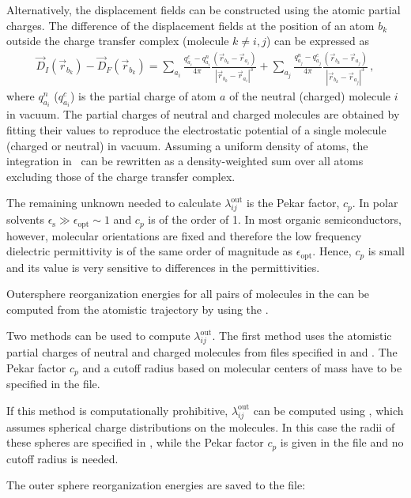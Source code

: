 Alternatively, the displacement fields can be constructed using the atomic partial charges. The difference of the displacement fields at the position of an atom $b_k$ outside the charge transfer complex (molecule $k \ne i,j$)  can be expressed as
\begin{eqnarray}
\label{equ:disp_atom}
\vec{D}_I(\vec{r}_{b_k}) - \vec{D}_F(\vec{r}_{b_k})  = 
\sum_{a_i} \frac{q_{a_i}^c - q_{a_i}^n}{4\pi } \frac{ (\vec{r}_{b_k} - \vec{r}_{a_i} ) }
                                            {|\vec{r}_{b_k}-\vec{r}_{a_i}|^3}+
\sum_{a_j} \frac{q_{a_j}^n - q_{a_j}^c}{4\pi } \frac{ (\vec{r}_{b_k}-\vec{r}_{a_j} ) } 
                                            {|\vec{r}_{b_k}-\vec{r}_{a_j}|^3}\,,
\end{eqnarray}
where $q^n_{a_i}$ ($q^c_{a_i}$) is the partial charge of atom $a$ of the neutral (charged) molecule $i$ in vacuum. The partial charges of neutral and charged molecules are obtained by fitting their values to reproduce the electrostatic potential of a single molecule (charged or neutral) in vacuum. 
%
Assuming a uniform density of atoms, the integration in~ can be rewritten as a density-weighted sum over all atoms excluding those of the charge transfer complex.

The remaining unknown needed to calculate $\lambda_{ij}^\text{out}$ is the Pekar factor, $c_p$. In polar solvents $\epsilon_\text{s}\gg\epsilon_\text{opt}\sim 1$ and $c_p$ is of the order of 1. In most organic semiconductors, however, molecular orientations are fixed and therefore the low frequency dielectric permittivity is of the same order of magnitude as $\epsilon_\text{opt}$. Hence, $c_p$ is small and its value is very sensitive to differences in the permittivities. 


Outersphere reorganization energies for all pairs of molecules in the  can be computed from the atomistic trajectory by using the  \calculator. 

Two methods can be used to compute $\lambda_{ij}^\text{out}$. The first method uses the atomistic partial charges of neutral and charged molecules from files specified in \xmlcsg and . The Pekar factor $c_p$ and a cutoff radius  based on molecular centers of mass have to be specified in the \xmloptions file. 

If this method is computationally prohibitive, $\lambda_{ij}^\text{out}$ can be computed using , which assumes spherical charge distributions on the molecules. In this case the radii of these spheres are specified in \xmlsegments, while the Pekar factor $c_p$ is given in the \xmloptions file and no cutoff radius is needed. 

The outer sphere reorganization energies are saved to the \sqlstate file:

